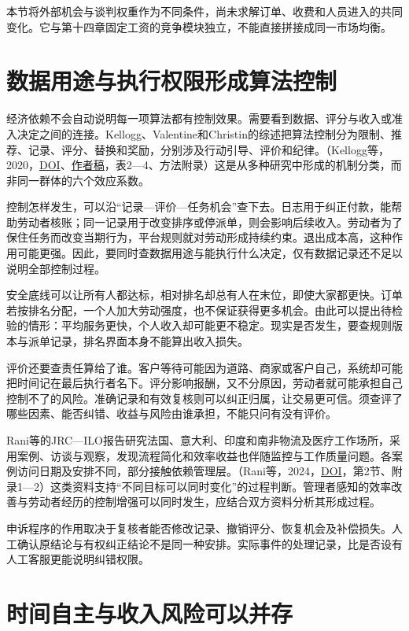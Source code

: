 \documentclass[UTF8,fontset=windows,12pt,a4paper,oneside,openany]{ctexbook}
\begin{document}
本节将外部机会与谈判权重作为不同条件，尚未求解订单、收费和人员进入的共同变化。它与第十四章固定工资的竞争模块独立，不能直接拼接成同一市场均衡。

\section{数据用途与执行权限形成算法控制}

经济依赖不会自动说明每一项算法都有控制效果。需要看到数据、评分与收入或准入决定之间的连接。Kellogg、Valentine和Christin的综述把算法控制分为限制、推荐、记录、评分、替换和奖励，分别涉及行动引导、评价和纪律。（Kellogg等，2020，\href{https://doi.org/10.5465/annals.2018.0174}{DOI}、\href{https://angelechristin.com/wp-content/uploads/2020/01/Algorithms-at-Work_Annals.pdf}{作者稿}，表2—4、方法附录）这是从多种研究中形成的机制分类，而非同一群体的六个效应系数。

控制怎样发生，可以沿“记录—评价—任务机会”查下去。日志用于纠正付款，能帮助劳动者核账；同一记录用于改变排序或停派单，则会影响后续收入。劳动者为了保住任务而改变当期行为，平台规则就对劳动形成持续约束。退出成本高，这种作用可能更强。因此，要同时查数据用途与能执行什么决定，仅有数据记录还不足以说明全部控制过程。

安全底线可以让所有人都达标，相对排名却总有人在末位，即使大家都更快。订单若按排名分配，一个人加大劳动强度，也不保证获得更多机会。由此可以提出待检验的情形：平均服务更快，个人收入却可能更不稳定。现实是否发生，要查规则版本与派单记录，排名界面本身不能算出收入损失。

评价还要查责任算给了谁。客户等待可能因为道路、商家或客户自己，系统却可能把时间记在最后执行者名下。评分影响报酬，又不分原因，劳动者就可能承担自己控制不了的风险。准确记录和有效复核则可以纠正归属，让交易更可信。须查评了哪些因素、能否纠错、收益与风险由谁承担，不能只问有没有评价。

Rani等的JRC—ILO报告研究法国、意大利、印度和南非物流及医疗工作场所，采用案例、访谈与观察，发现流程简化和效率收益也伴随监控与工作质量问题。各案例访问日期及安排不同，部分接触依赖管理层。（Rani等，2024，\href{https://doi.org/10.2760/712475}{DOI}，第2节、附录1—2）这类资料支持“不同目标可以同时变化”的过程判断。管理者感知的效率改善与劳动者经历的控制增强可以同时发生，应结合双方资料分析其形成过程。

申诉程序的作用取决于复核者能否修改记录、撤销评分、恢复机会及补偿损失。人工确认原结论与有权纠正结论不是同一种安排。实际事件的处理记录，比是否设有人工客服更能说明纠错权限。

\section{时间自主与收入风险可以并存}
\end{document}
